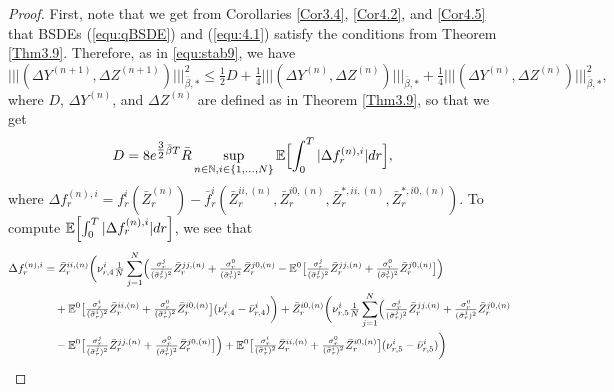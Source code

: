 \documentclass[10pt,a4paper]{amsart}
\newcommand{\bR}{\bar{R}}
\newcommand{\trinm}[1]{\vert\!\vert\!\vert #1 \vert\!\vert\!\vert}
\begin{document}
\begin{proof}



First, note that we get from Corollaries \ref{Cor3.4}, \ref{Cor4.2}, and \ref{Cor4.5} that BSDEs (\ref{equ:qBSDE}) and (\ref{equ:4.1}) satisfy the conditions from Theorem \ref{Thm3.9}. Therefore, as in \eqref{equ:stab9}, we have
\[
\trinm{(\Delta Y^{(n+1)},\Delta Z^{(n+1)})}_{\bar{\beta},*}^{2} \leq \tfrac{1}{2}D + \tfrac{1}{4} \trinm{(\Delta Y^{(n)},\Delta Z^{(n)})}_{\bar{\beta},*} + \tfrac{1}{4}\trinm{(\Delta Y^{(n)},\Delta Z^{(n)})}_{\bar{\beta},*}^{2},
\]
where $D$, $\Delta Y^{(n)}$, and $\Delta Z^{(n)}$ are defined as in Theorem \ref{Thm3.9},
so that we get
\begin{align}
D &= 8e^{\tfrac{3}{2} \bar{\beta} T} \bR \sup_{n \in \mathbb{N},i \in \{1,...,N\}}\mathbb{E}\Bigl[\int_{0}^{T}|\Delta f_{r}^{(n),i}|dr\Bigr], \nonumber
\end{align}
where
$
\Delta f_{r}^{(n),i} = f_{r}^{i}(\bar{Z}_{r}^{(n)})-\bar{f}_{r}^{i}(\bar{Z}_{r}^{ii,(n)},\bar{Z}_{r}^{i0,(n)},\bar{Z}_{r}^{*,ii,(n)},\bar{Z}_{r}^{*,i0,(n)}).
$
To compute $\mathbb{E}\Bigl[\int_{0}^{T}|\Delta f_{r}^{(n),i}|dr\Bigr]$, we see that
\begin{align}
\Delta f_{r}^{(n),i} &= \bar{Z}_{r}^{ii,(n)}\biggl(\nu_{r,4}^{i}\tfrac{1}{N}\sum_{j=1}^{N}\Bigl(\tfrac{\sigma_{r}^{j}}{(\bar{\sigma}_{r}^{j})^{2}}\bar{Z}_{r}^{jj,(n)} + \tfrac{\sigma_{r}^{0}}{(\bar{\sigma}_{r}^{j})^{2}}\bar{Z}_{r}^{j0,(n)} - \mathbb{E}^{0}\bigl[\tfrac{\sigma_{r}^{j}}{(\bar{\sigma}_{r}^{j})^{2}}\bar{Z}_{r}^{jj,(n)}+\tfrac{\sigma_{r}^{0}}{(\bar{\sigma}_{r}^{j})^{2}}\bar{Z}_{r}^{j0,(n)}\bigr]\Bigr) \nonumber \\
&\ \ \ + \mathbb{E}^{0}\bigl[\tfrac{\sigma_{r}^{i}}{(\bar{\sigma}_{r}^{i})^{2}}\bar{Z}_{r}^{ii,(n)}+\tfrac{\sigma_{r}^{0}}{(\bar{\sigma}_{r}^{i})^{2}}\bar{Z}_{r}^{i0,(n)}\bigr](\nu_{r,4}^{i}-\bar{\nu}_{r,4}^{i})\biggr) + \bar{Z}_{r}^{i0,(n)}\biggl(\nu_{r,5}^{i}\tfrac{1}{N}\sum_{j=1}^{N}\Bigl(\tfrac{\sigma_{r}^{j}}{(\bar{\sigma}_{r}^{j})^{2}}\bar{Z}_{r}^{jj,(n)} + \tfrac{\sigma_{r}^{0}}{(\bar{\sigma}_{r}^{j})^{2}}\bar{Z}_{r}^{j0,(n)} \nonumber \\
&\ \ \ - \mathbb{E}^{0}\bigl[\tfrac{\sigma_{r}^{j}}{(\bar{\sigma}_{r}^{j})^{2}}\bar{Z}_{r}^{jj,(n)}+\tfrac{\sigma_{r}^{0}}{(\bar{\sigma}_{r}^{j})^{2}}\bar{Z}_{r}^{j0,(n)}\bigr]\Bigr) + \mathbb{E}^{0}\bigl[\tfrac{\sigma_{r}^{i}}{(\bar{\sigma}_{r}^{i})^{2}}\bar{Z}_{r}^{ii,(n)}+\tfrac{\sigma_{r}^{0}}{(\bar{\sigma}_{r}^{i})^{2}}\bar{Z}_{r}^{i0,(n)}\bigr](\nu_{r,5}^{i}-\bar{\nu}_{r,5}^{i})\biggr) \nonumber \\

\end{align}
\end{proof}
\end{document}
